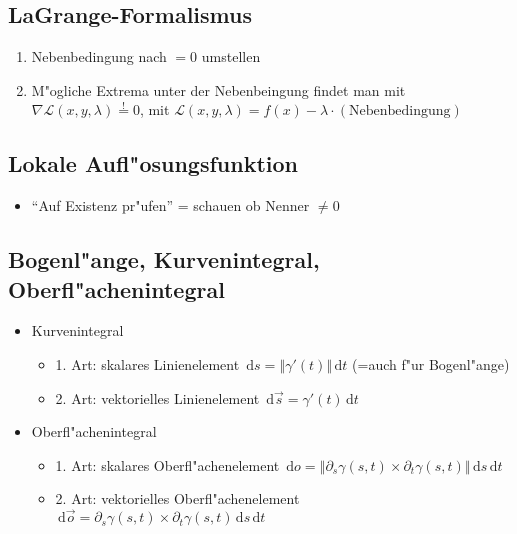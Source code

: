 \documentclass[fleqn,12pt]{scrartcl}
\newcommand{\id}{\, \mathrm{d}}
\newcommand{\absbb}[1]{
	\left \Vert #1 \right \Vert
}
\begin{document}
\subsection{LaGrange-Formalismus}
		\begin{enumerate}
			\item
				Nebenbedingung nach $=0$ umstellen
			\item
				M"ogliche Extrema unter der Nebenbeingung findet man mit $\nabla \mathcal{L}(x, y, \lambda) \overset!= 0$, mit $\mathcal{L}(x,y,\lambda) = f(x) - \lambda \cdot (\text{Nebenbedingung})$
		\end{enumerate}


\subsection{Lokale Aufl"osungsfunktion}
\begin{itemize}
	\item
		\enquote{Auf Existenz pr"ufen} = schauen ob Nenner $\neq 0$
\end{itemize}

\subsection{Bogenl"ange, Kurvenintegral, Oberfl"achenintegral}
\begin{itemize}
	\item{}
		Kurvenintegral
		\begin{itemize}
			\item 1. Art: skalares Linienelement $\id s  = \absbb{\gamma'(t)} \id t$ (=auch f"ur Bogenl"ange)
			\item 2. Art: vektorielles Linienelement $\id \vec s = \gamma'(t) \id t$
		\end{itemize}
	\item{}
		Oberfl"achenintegral
		\begin{itemize}
			\item
				1. Art: skalares Oberfl"achenelement $\id o = \absbb{\partial_s\gamma(s,t) \times \partial_t\gamma(s,t)} \id s \id t$
			\item 2. Art:
				vektorielles Oberfl"achenelement $\id \vec o = \partial_s\gamma(s,t) \times \partial_t\gamma(s,t) \id s  \id t$
		\end{itemize}

\end{itemize}
\end{document}
